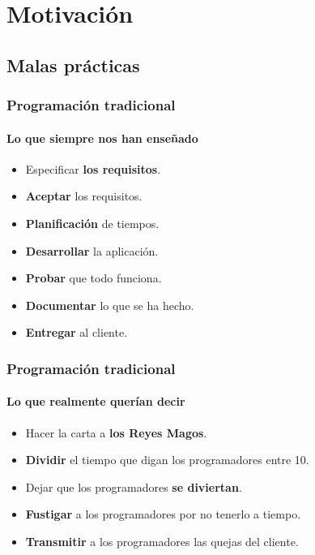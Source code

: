  \section{Motivación}

  \subsection{Malas prácticas}

  \begin{frame}
   \frametitle{Programación tradicional}
   \framesubtitle{Lo que siempre nos han enseñado}


   \begin{itemize}
    \item<1-> Especificar \textbf{los requisitos}.
    \item<2-> \textbf{Aceptar} los requisitos.
    \item<3-> \textbf{Planificación} de tiempos.
    \item<4-> \textbf{Desarrollar} la aplicación.
    \item<5-> \textbf{Probar} que todo funciona.
    \item<6-> \textbf{Documentar} lo que se ha hecho.
    \item<7-> \textbf{Entregar} al cliente.
   \end{itemize}
  \end{frame}

  \begin{frame}
   \frametitle{Programación tradicional}
   \framesubtitle{Lo que realmente querían decir}


   \begin{itemize}
    \item<1-> Hacer la carta a \textbf{los Reyes Magos}.
    \item<2-> \textbf{Dividir} el tiempo que digan los programadores entre 10.
    \item<3-> Dejar que los programadores \textbf{se diviertan}.
    \item<4-> \textbf{Fustigar} a los programadores por no tenerlo a tiempo.
    \item<5-> \textbf{Transmitir} a los programadores las quejas del cliente.
   \end{itemize}
  \end{frame}

